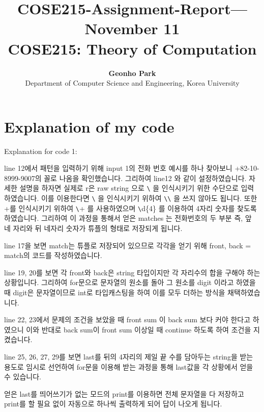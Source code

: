 \documentclass[12pt]{extarticle}
\title{\textbf{COSE215-Assignment-Report---November 11}  \\ COSE215: Theory of Computation}
\author{\textbf{Geonho Park} \\ Department of Computer Science and Engineering, Korea University}
\begin{document}
	\maketitle
    
	\section{Explanation of my code}
		
        
		Explanation for code 1:\newline
		
		line 12에서 패턴을 입력하기 위해 input 1의 전화 번호 예시를 하나 찾아보니 +82-10-8999-9007의 꼴로 나옴을 확인했습니다. 그리하여 line12 와 같이 설정하였습니다. 자세한 설명을 하자면
		실제로 r은 raw string 으로 \texttt{\textbackslash} 을 인식시키기 위한 수단으로 입력하였습니다. 이를 이용한다면 \texttt{\textbackslash} 을 인식시키기 위하여 \texttt{\textbackslash}\texttt{\textbackslash} 을 쓰지 않아도 됩니다.
		또한 +를 인식시키기 위하여 \texttt{\textbackslash}+ 를 사용하였으며 \texttt{\textbackslash}d\{4\} 를 이용하여 4자리 숫자를 찾도록 하였습니다. 그리하여 이 과정을 통해서 얻은 matches 는 전화번호의 두 부분 즉,  앞 네 자리와 뒤 네자리 숫자가 튜플의 형태로 저장되게 됩니다.\newline

		line 17을 보면 match는 튜플로 저장되어 있으므로 각각을 얻기 위해 front, back = match의 코드를 작성하였습니다.\newline

		line 19, 20를 보면 각 front와 back은 string 타입이지만 각 자리수의 합을 구해야 하는 상황입니다. 
		그리하여 for문으로 문자열의 원소를 돌아 그 원소를 digit 이라고 하였을때 digit은 문자열이므로 int로 타입캐스팅을 하여 이를 모두 더하는 방식을 채택하였습니다.\newline

		line 22, 23에서 문제의 조건을 보았을 때 front sum 이 back sum 보다 커야 한다고 하였으니 이와 반대로 back sum이 front sum 이상일 때 continue 하도록 하여 조건을 지켰습니다.\newline

		line 25, 26, 27, 29를 보면 last를 뒤의 4자리의 제일 끝 수를 담아두는 string을 받는 용도로 임시로 선언하여 for문을 이용해 받는 과정을 통해 last값을 각 상황에서 얻을 수 있습니다. \newline
        
		얻은 last를 띄어쓰기가 없는 모드의 print를 이용하면 전체 문자열을 다 저장하고 print를 할 필요 없이 자동으로 하나씩 출력하게 되어 답이 나오게 됩니다. \newline
\end{document}
